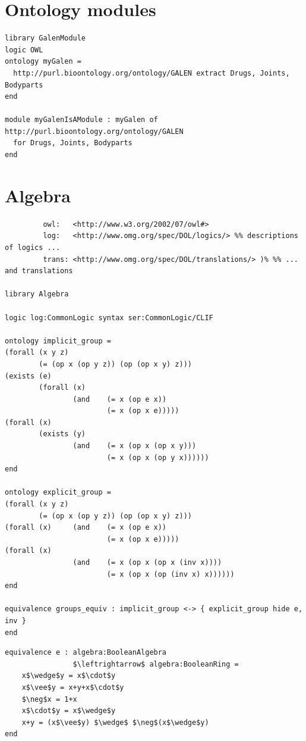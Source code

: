 \documentclass[10pt,fleqn,%
\ifpretendfinal
final%
\else
draft%
\fi,
]{scrreprt}
\newcommand{\sclause}[1]{\section{#1}}
\begin{document}
\sclause{Ontology modules}

\begin{lstlisting}[basicstyle=\ttfamily,language=dolText,morekeywords={props,ObjectProperty,Class,DisjointUnionOf,SubClassOf,Characteristics,Transitive,Asymmetric,SubPropertyOf,DisjointClasses,EquivalentTo,inverse,only,forall,iff,if,or,exists,bridge,distributed,extract},escapechar=@,mathescape]
library GalenModule
logic OWL
ontology myGalen = 
  http://purl.bioontology.org/ontology/GALEN extract Drugs, Joints, Bodyparts
end

module myGalenIsAModule : myGalen of http://purl.bioontology.org/ontology/GALEN 
  for Drugs, Joints, Bodyparts
end
\end{lstlisting}

\sclause{Algebra}

\begin{lstlisting}[basicstyle=\ttfamily,language=dolText,morekeywords={props,ObjectProperty,Class,DisjointUnionOf,SubClassOf,Characteristics,Transitive,Asymmetric,SubPropertyOf,DisjointClasses,EquivalentTo,inverse,only,forall,iff,if,or,exists,bridge,distributed,equivalence},escapechar=@,mathescape]
%prefix( :     <http://www.example.org/alignment#>
         owl:   <http://www.w3.org/2002/07/owl#>
         log:   <http://www.omg.org/spec/DOL/logics/> %% descriptions of logics ...
         trans: <http://www.omg.org/spec/DOL/translations/> )% %% ... and translations

library Algebra

logic log:CommonLogic syntax ser:CommonLogic/CLIF

ontology implicit_group =
(forall (x y z)
        (= (op x (op y z)) (op (op x y) z)))
(exists (e)
        (forall (x)
                (and    (= x (op e x))
                        (= x (op x e)))))
(forall (x)
        (exists (y)
                (and    (= x (op x (op x y)))
                        (= x (op x (op y x))))))
end

ontology explicit_group =
(forall (x y z)
        (= (op x (op y z)) (op (op x y) z)))
(forall (x)     (and    (= x (op e x))
                        (= x (op x e)))))
(forall (x)
                (and    (= x (op x (op x (inv x))))
                        (= x (op x (op (inv x) x))))))
end

equivalence groups_equiv : implicit_group <-> { explicit_group hide e, inv }
end
\end{lstlisting}

\begin{lstlisting}[basicstyle=\ttfamily,language=dolText,morekeywords={props,ObjectProperty,Class,DisjointUnionOf,SubClassOf,Characteristics,Transitive,Asymmetric,SubPropertyOf,DisjointClasses,EquivalentTo,inverse,only,forall,iff,if,or,exists,sort,ops,in,approximate,extract,equivalence,spec},escapechar=@,mathescape]
equivalence e : algebra:BooleanAlgebra
                $\leftrightarrow$ algebra:BooleanRing =
    x$\wedge$y = x$\cdot$y
    x$\vee$y = x+y+x$\cdot$y
    $\neg$x = 1+x
    x$\cdot$y = x$\wedge$y
    x+y = (x$\vee$y) $\wedge$ $\neg$(x$\wedge$y)
end
\end{lstlisting}
\end{document}
